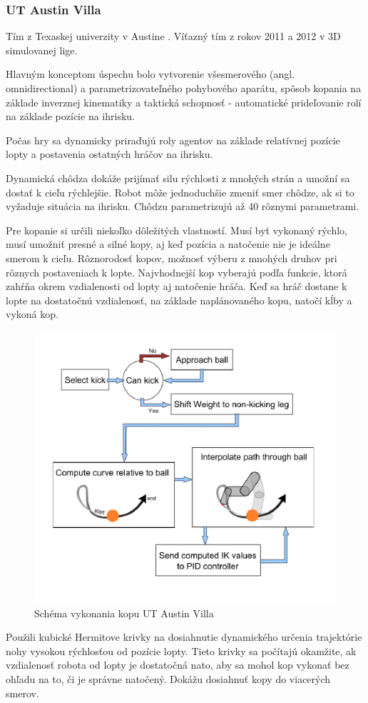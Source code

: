 \subsubsection{UT Austin Villa}
	\label{austin_villa}
Tím z Texaskej univerzity v Austine \cite{villa2013, villa_team, villa2012}. Víťazný tím z rokov 2011 a 2012 v 3D simulovanej lige.

Hlavným konceptom úspechu bolo vytvorenie všesmerového (angl. omnidirectional) a parametrizovateľného pohybového aparátu, spôsob kopania na základe inverznej kinematiky a taktická schopnosť - automatické prideľovanie rolí na základe pozície na ihrisku. 

Počas hry sa dynamicky priraďujú roly agentov na základe relatívnej pozície lopty a postavenia ostatných hráčov na ihrisku.

Dynamická chôdza dokáže prijímať silu rýchlosti z mnohých strán a umožní sa dostať k cieľu rýchlejšie. Robot môže jednoduchšie zmeniť smer chôdze, ak si to vyžaduje situácia na ihrisku. Chôdzu parametrizujú až 40 rôznymi parametrami. 

Pre kopanie si určili niekoľko dôležitých vlastností. Musí byť vykonaný rýchlo, musí umožniť presné a silné kopy, aj keď pozícia a natočenie nie je ideálne smerom k cieľu. Rôznorodosť kopov, možnosť výberu z mnohých druhov pri rôznych postaveniach k lopte. Najvhodnejší kop vyberajú podľa funkcie, ktorá zahŕňa okrem vzdialenosti od lopty aj natočenie hráča. Keď sa hráč dostane k lopte na dostatočnú vzdialenosť, na základe naplánovaného kopu, natočí kĺby a vykoná kop.

\begin{figure}[H]
	\center
	\includegraphics[scale=1]{./data/kick_arch_austin_villa}
	\caption{Schéma vykonania kopu UT Austin Villa \cite{villa2012}}
	\label{pic_kick_arch_austin_villa}
\end{figure}

Použili kubické Hermitove krivky na dosiahnutie dynamického určenia trajektórie nohy vysokou rýchlosťou od pozície lopty. Tieto krivky sa počítajú okamžite, ak vzdialenosť robota od lopty je dostatočná nato, aby sa mohol kop vykonať bez ohľadu na to, či je správne natočený. Dokážu dosiahnuť kopy do viacerých smerov. 


